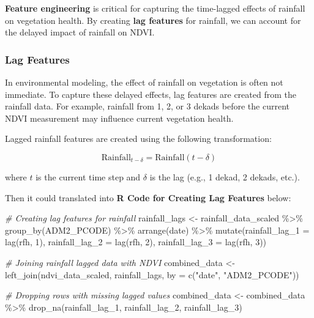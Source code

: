 \documentclass[
]{article}
\newenvironment{Shaded}{}{}
\newcommand{\AttributeTok}[1]{\textcolor[rgb]{0.49,0.56,0.16}{#1}}
\newcommand{\CommentTok}[1]{\textcolor[rgb]{0.38,0.63,0.69}{\textit{#1}}}
\newcommand{\DecValTok}[1]{\textcolor[rgb]{0.25,0.63,0.44}{#1}}
\newcommand{\FunctionTok}[1]{\textcolor[rgb]{0.02,0.16,0.49}{#1}}
\newcommand{\NormalTok}[1]{#1}
\newcommand{\OtherTok}[1]{\textcolor[rgb]{0.00,0.44,0.13}{#1}}
\newcommand{\SpecialCharTok}[1]{\textcolor[rgb]{0.25,0.44,0.63}{#1}}
\newcommand{\StringTok}[1]{\textcolor[rgb]{0.25,0.44,0.63}{#1}}
\begin{document}
\textbf{Feature engineering} is critical for capturing the time-lagged
effects of rainfall on vegetation health. By creating \textbf{lag
features} for rainfall, we can account for the delayed impact of
rainfall on NDVI.

\subsubsection{Lag Features}\label{lag-features}

In environmental modeling, the effect of rainfall on vegetation is often
not immediate. To capture these delayed effects, lag features are
created from the rainfall data. For example, rainfall from 1, 2, or 3
dekads before the current NDVI measurement may influence current
vegetation health.

Lagged rainfall features are created using the following transformation:

\[
\text{Rainfall}_{t-\delta} = \text{Rainfall}(t-\delta)
\]

where \(t\) is the current time step and \(\delta\) is the lag (e.g., 1
dekad, 2 dekads, etc.).

Then it could translated into \textbf{R Code for Creating Lag Features}
below:

\begin{Shaded}
\begin{Highlighting}[]
\CommentTok{\# Creating lag features for rainfall}
\NormalTok{rainfall\_lags }\OtherTok{\textless{}{-}}\NormalTok{ rainfall\_data\_scaled }\SpecialCharTok{\%\textgreater{}\%}
  \FunctionTok{group\_by}\NormalTok{(ADM2\_PCODE) }\SpecialCharTok{\%\textgreater{}\%}
  \FunctionTok{arrange}\NormalTok{(date) }\SpecialCharTok{\%\textgreater{}\%}
  \FunctionTok{mutate}\NormalTok{(}\AttributeTok{rainfall\_lag\_1 =} \FunctionTok{lag}\NormalTok{(rfh, }\DecValTok{1}\NormalTok{),}
         \AttributeTok{rainfall\_lag\_2 =} \FunctionTok{lag}\NormalTok{(rfh, }\DecValTok{2}\NormalTok{),}
         \AttributeTok{rainfall\_lag\_3 =} \FunctionTok{lag}\NormalTok{(rfh, }\DecValTok{3}\NormalTok{))}

\CommentTok{\# Joining rainfall lagged data with NDVI}
\NormalTok{combined\_data }\OtherTok{\textless{}{-}} \FunctionTok{left\_join}\NormalTok{(ndvi\_data\_scaled, }
\NormalTok{                          rainfall\_lags, }
                          \AttributeTok{by =} \FunctionTok{c}\NormalTok{(}\StringTok{"date"}\NormalTok{, }\StringTok{"ADM2\_PCODE"}\NormalTok{))}

\CommentTok{\# Dropping rows with missing lagged values}
\NormalTok{combined\_data }\OtherTok{\textless{}{-}}\NormalTok{ combined\_data }\SpecialCharTok{\%\textgreater{}\%} \FunctionTok{drop\_na}\NormalTok{(rainfall\_lag\_1, }
\NormalTok{                                          rainfall\_lag\_2, }
\NormalTok{                                          rainfall\_lag\_3)}
\end{Highlighting}
\end{Shaded}
\end{document}
